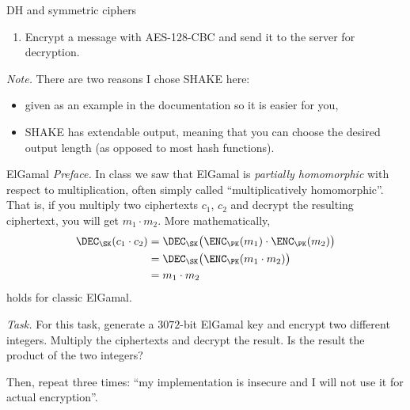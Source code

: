 \documentclass{practice}
\begin{document}
\begin{task}{DH and symmetric ciphers}
\begin{enumerate}
    Note that I call the session key partial here.
    Good practice is that both the server and the client contribute to the ephemeral session key.
    In this case, only you contribute an ephemeral component while the server only provides a static key.
    The reason for that is to make calling the Discord bot simpler.

    Some more info on static-ephemeral DH \href{https://crypto.stackexchange.com/a/61760}{\emph{here}}.

    \item Encrypt a message with AES-128-CBC and send it to the server for decryption.
  \end{enumerate}

  \textit{Note.}
  There are two reasons I chose SHAKE here:
  \begin{itemize}
    \item given as an example in the documentation so it is easier for you,
    \item SHAKE has extendable output, meaning that you can choose the desired output length (as opposed to most hash functions).
  \end{itemize}
\end{task}

\begin{task}{ElGamal}
  \textit{Preface.}
  In class we saw that ElGamal is \emph{partially homomorphic} with respect to multiplication, often simply called \enquote{multiplicatively homomorphic}.
  That is, if you multiply two ciphertexts $c_1$, $c_2$ and decrypt the resulting ciphertext, you will get $m_1 \cdot m_2$.
  More mathematically,
  \begin{align*}
    \DEC_\SK(c_1 \cdot c_2) &= 
    \DEC_\SK\bigl(\ENC_\PK(m_1) \cdot \ENC_\PK(m_2)\bigr)\\
    &= \DEC_\SK\bigl(\ENC_\PK(m_1\cdot m_2)\bigr)\\
    &= m_1 \cdot m_2
  \end{align*}
  holds for classic ElGamal.

  \textit{Task.}
  For this task, generate a $3072$-bit ElGamal key and encrypt two different integers.
  Multiply the ciphertexts and decrypt the result.
  Is the result the product of the two integers?

  Then, repeat three times: \enquote{my implementation is insecure and I will not use it for actual encryption}.
\end{task}
\end{document}
